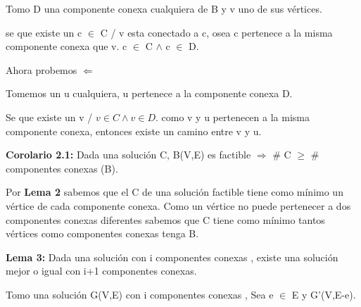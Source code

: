 Tomo D una componente conexa cualquiera de B y v uno de sus vértices.

se que existe un c $\in$ C / v esta conectado a c, osea c pertenece a la misma componente conexa que v. c $\in$ C $\wedge$ c $\in$ D.

Ahora probemos $\Leftarrow$

Tomemos un u cualquiera, u pertenece a la componente conexa D.

Se que existe un v / $v \in C \wedge v \in D$. como v y u pertenecen a la misma componente conexa, entonces existe un camino entre v y u.

\textbf{Corolario 2.1:} Dada una solución C, B(V,E) es factible $\Rightarrow$ \# C $\geq$ \# componentes conexas (B).

Por \textbf{Lema 2} sabemos que el C de una solución factible tiene como mínimo un vértice de cada componente conexa. Como un vértice no puede pertenecer a dos componentes conexas diferentes sabemos que C tiene como mínimo tantos vértices como componentes conexas tenga B.

%
%
%
%
%


\textbf{Lema 3:} Dada una solución con i componentes conexas , existe una solución mejor o igual con i+1 componentes conexas.

Tomo una solución G(V,E) con i componentes conexas , Sea e $\in$ E y G'(V,E-e).

